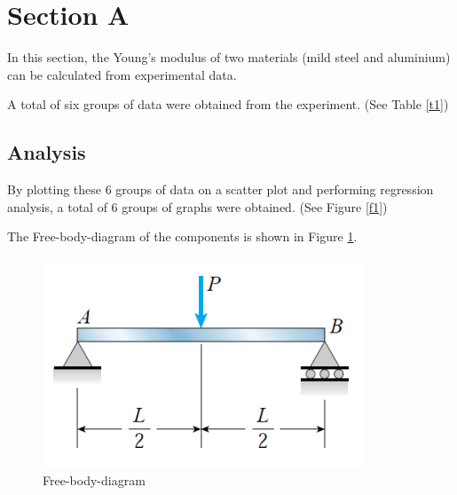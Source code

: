 \section{Section A}
\label{sec:Section A}
\FloatBarrier %


In this section, the Young's modulus of two materials 
(mild steel and aluminium) can be calculated from experimental data.

A total of six groups of data were obtained from the experiment. (See Table \ref{t1})

\subsection*{Analysis}

By plotting these 6 groups of data on a scatter plot and performing 
regression analysis, a total of 6 groups of graphs were obtained. (See Figure \ref{f1})

The Free-body-diagram of the components is shown in Figure \ref{ff1}.

\begin{figure}
    \centering
    \includegraphics[]{./fig/1.png}
    \caption{Free-body-diagram}
    \label{ff1}
\end{figure}

